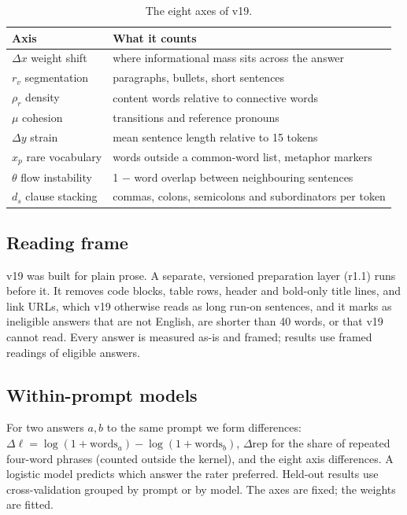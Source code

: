\documentclass[11pt]{article}
\begin{document}
\begin{table}[htbp]\centering\small
\begin{tabularx}{\linewidth}{@{}lX@{}}\toprule
Axis & What it counts \\\midrule
$\Delta x$ weight shift & where informational mass sits across the answer \\
$r_v$ segmentation & paragraphs, bullets, short sentences \\
$\rho_r$ density & content words relative to connective words \\
$\mu$ cohesion & transitions and reference pronouns \\
$\Delta y$ strain & mean sentence length relative to 15 tokens \\
$x_p$ rare vocabulary & words outside a common-word list, metaphor markers \\
$\theta$ flow instability & 1 $-$ word overlap between neighbouring sentences \\
$d_s$ clause stacking & commas, colons, semicolons and subordinators per token \\\bottomrule
\end{tabularx}
\caption{The eight axes of v19.}\label{tab:axes}
\end{table}

\subsection{Reading frame}
v19 was built for plain prose. A separate, versioned preparation layer (r1.1) runs before it. It removes code blocks, table rows, header and bold-only title lines, and link URLs, which v19 otherwise reads as long run-on sentences, and it marks as ineligible answers that are not English, are shorter than 40 words, or that v19 cannot read. Every answer is measured as-is and framed; results use framed readings of eligible answers.

\subsection{Within-prompt models}
For two answers $a,b$ to the same prompt we form differences: $\Delta\ell = \log(1+\text{words}_a) - \log(1+\text{words}_b)$, $\Delta\mathrm{rep}$ for the share of repeated four-word phrases (counted outside the kernel), and the eight axis differences. A logistic model predicts which answer the rater preferred. Held-out results use cross-validation grouped by prompt or by model. The axes are fixed; the weights are fitted.
\end{document}
